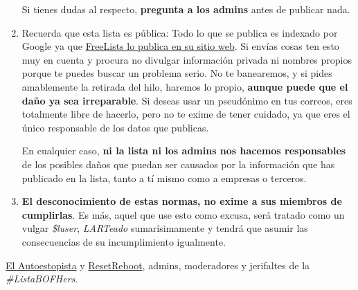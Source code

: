 \begin{enumerate}
  Si tienes dudas al respecto, \textbf{pregunta a los admins} antes de
  publicar nada.
\item
  Recuerda que esta lista es pública: Todo lo que se publica es indexado
  por Google ya que
  \href{http://www.freelists.org/archive/bofhers/}{FreeLists lo publica
  en su sitio web}. Si envías cosas ten esto muy en cuenta y procura no
  divulgar información privada ni nombres propios porque te puedes
  buscar un problema serio. No te banearemos, y si pides amablemente la
  retirada del hilo, haremos lo propio, \textbf{aunque puede que el daño
  ya sea irreparable}. Si deseas usar un pseudónimo en tus correos, eres
  totalmente libre de hacerlo, pero no te exime de tener cuidado, ya que
  eres el único responsable de los datos que publicas.

  En cualquier caso, \textbf{ni la lista ni los admins nos hacemos
  responsables} de los posibles daños que puedan ser causados por la
  información que has publicado en la lista, tanto a tí mismo como a
  empresas o terceros.
\item
  \textbf{El desconocimiento de estas normas, no exime a sus miembros de
  cumplirlas}. Es más, aquel que use esto como excusa, será tratado como
  un vulgar \emph{\$luser}, \emph{LARTeado} sumarísimamente y tendrá que
  asumir las consecuencias de su incumplimiento igualmente.
\end{enumerate}

\href{http://bofhers.net/users/elautoestopista}{El Autoestopista} y
\href{http://bofhers.net/users/resetreboot}{ResetReboot}, admins,
moderadores y jerifaltes de la \emph{\#ListaBOFHers}.

